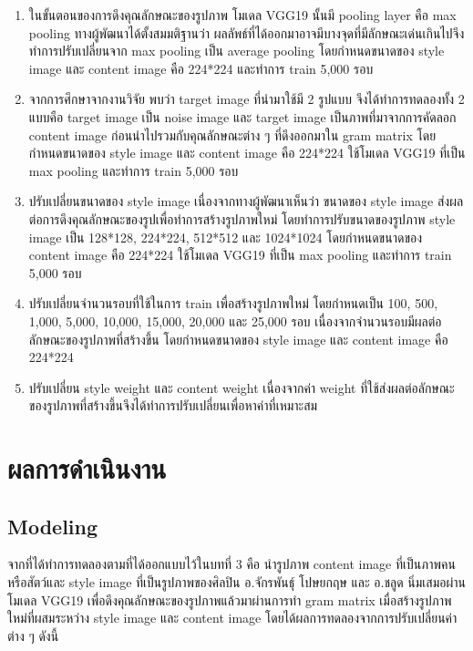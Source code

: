 \documentclass[12pt,oneside,openright,a4paper]{cpe-thai-project}
\begin{document}
\begin{enumerate}
  \item ในขั้นตอนของการดึงคุณลักษณะของรูปภาพ โมเดล VGG19 นั้นมี pooling layer คือ max pooling ทางผู้พัฒนาได้ตั้งสมมติฐานว่า ผลลัพธ์ที่ได้ออกมาอาจมีบางจุดที่มีลักษณะเด่นเกินไปจึงทำการปรับเปลี่ยนจาก max pooling เป็น average pooling โดยกำหนดขนาดของ style image และ content image คือ 224*224 และทำการ train 5,000 รอบ
  \item จากการศึกษาจากงานวิจัย พบว่า target image ที่นำมาใช้มี 2 รูปแบบ จึงได้ทำการทดลองทั้ง 2 แบบคือ target image เป็น noise image และ target image เป็นภาพที่มาจากการคัดลอก content image ก่อนนำไปรวมกับคุณลักษณะต่าง ๆ ที่ดึงออกมาใน gram matrix โดยกำหนดขนาดของ style image และ content image คือ 224*224 ใช้โมเดล VGG19 ที่เป็น max pooling และทำการ train 5,000 รอบ
  \item ปรับเปลี่ยนขนาดของ style image เนื่องจากทางผู้พัฒนาเห็นว่า ขนาดของ style image ส่งผลต่อการดึงคุณลักษณะของรูปเพื่อทำการสร้างรูปภาพใหม่ โดยทำการปรับขนาดของรูปภาพ style image เป็น 128*128, 224*224, 512*512 และ 1024*1024 โดยกำหนดขนาดของ content image คือ 224*224 ใช้โมเดล VGG19 ที่เป็น max pooling และทำการ train 5,000 รอบ
  \item ปรับเปลี่ยนจำนวนรอบที่ใช้ในการ train เพื่อสร้างรูปภาพใหม่ โดยกำหนดเป็น 100, 500, 1,000, 5,000, 10,000, 15,000, 20,000 และ 25,000 รอบ เนื่องจากจำนวนรอบมีผลต่อลักษณะของรูปภาพที่สร้างขึ้น โดยกำหนดขนาดของ style image และ content image คือ 224*224
  \item ปรับเปลี่ยน style weight และ content weight เนื่องจากค่า weight ที่ใช้ส่งผลต่อลักษณะของรูปภาพที่สร้างขึ้นจึงได้ทำการปรับเปลี่ยนเพื่อหาค่าที่เหมาะสม
\end{enumerate}










\chapter{ผลการดำเนินงาน}


\section{Modeling} 
จากที่ได้ทําการทดลองตามที่ได้ออกแบบไว้ในบทที่ 3 คือ นำรูปภาพ content image ที่เป็นภาพคนหรือสัตว์และ style image ที่เป็นรูปภาพของศิลปิน อ.จักรพันธุ์ โปษยกฤษ และ อ.ชลูด นิ่มเสมอผ่านโมเดล VGG19 เพื่อดึงคุณลักษณะของรูปภาพแล้วมาผ่านการทำ gram matrix เมื่อสร้างรูปภาพใหม่ที่ผสมระหว่าง style image และ content image โดยได้ผลการทดลองจากการปรับเปลี่ยนค่าต่าง ๆ ดังนี้
\end{document}
